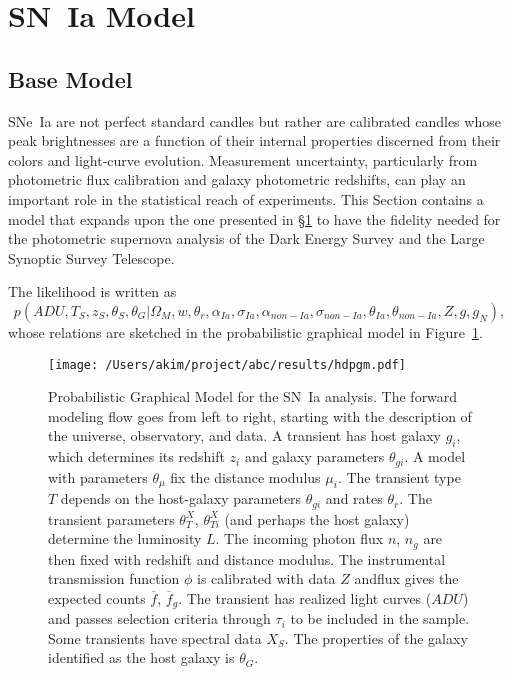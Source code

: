 \documentclass[preprint,3p]{elsarticle}
\begin{document}
\section{SN~Ia Model}
\label{snIamodel:sec}
\subsection{Base Model}
SNe~Ia are not perfect standard candles but rather are calibrated candles whose
peak brightnesses are a
function of their internal properties discerned from their colors and light-curve evolution.
Measurement uncertainty, particularly from photometric flux
calibration and galaxy photometric redshifts, can play an important role in the statistical
reach of experiments.  This Section contains a model that expands upon the one
presented in \S\ref{snIamodel:sec} to have the fidelity needed for the photometric
supernova analysis of the Dark Energy Survey and the Large Synoptic Survey Telescope.

The likelihood is written as
\begin{equation}
p(\mathit{ADU}, {{T}}_S,{{z}}_S, \theta_{S}, \theta_G |  \Omega_M, w, \theta_r,\alpha_{Ia},\sigma_{Ia}, \alpha_{\mathit{non-Ia}},\sigma_{\mathit{non-Ia}}, \theta_{Ia}, \theta_{non-Ia}, Z, g, g_N),
\label{likelihood2:eqn}
\end{equation}
whose relations are sketched in the probabilistic graphical model in Figure~\ref{pgm:fig}.

\begin{figure}[htbp] %
   \centering
   \texttt{[image: /Users/akim/project/abc/results/hdpgm.pdf]} 
   \caption{Probabilistic Graphical Model for the SN~Ia analysis.  
   The forward modeling
   flow goes from left to right, starting with the description of the universe, observatory,
   and data.    A transient has host galaxy $g_i$, which determines its redshift $z_i$
   and galaxy parameters $\theta_{gi}$.
   A model with parameters $\theta_\mu$ fix the distance modulus $\mu_i$.
   The transient type $T$ depends on the host-galaxy parameters  $\theta_{gi}$
   and rates $\theta_r$.   The transient
   parameters $\theta_T^X$, $\theta_{Ti}^X$ (and perhaps the host galaxy) determine the luminosity $L$.       The 
   incoming photon flux $n$, $n_g$  are then fixed
   with redshift and distance modulus.
   The instrumental transmission function $\phi$ is calibrated with data ${Z}$ andflux
   gives the expected
   counts $\overline{f}$, $\overline{f}_g$. 
   The transient has realized light curves (${ADU}$) and passes selection criteria
   through $\tau_i$ to be included in the sample.  Some transients have spectral data
   ${X}_S$.  The properties of the galaxy identified as the host galaxy is $\theta_G$. 
   \label{pgm:fig}}
\end{figure}
\end{document}
